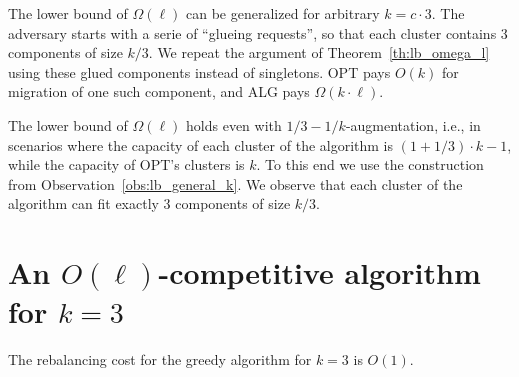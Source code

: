 \begin{observation}
  The lower bound of $\Omega(\ell)$ can be generalized for arbitrary $k = c\cdot 3$.
  The adversary starts with a serie of ``glueing requests'', so that each cluster contains 3 components of size $k/3$.
  We repeat the argument of Theorem~\ref{th:lb_omega_l} using these glued components instead of singletons.
  OPT pays $O(k)$ for migration of one such component, and ALG pays $\Omega(k \cdot \ell)$.
  \label{obs:lb_general_k}
\end{observation}

\begin{observation}
  The lower bound of $\Omega(\ell)$ holds even with $1/3-1/k$-augmentation, i.e., in scenarios where the capacity of each cluster of the algorithm is $(1+1/3)\cdot k - 1$, while the capacity of OPT's clusters is $k$.
  To this end we use the construction from Observation~\ref{obs:lb_general_k}.
  We observe that each cluster of the algorithm can fit exactly $3$ components of size $k/3$.
\end{observation}

\section{An $O(\ell)$-competitive algorithm for $k=3$}

\begin{theorem}
  The rebalancing cost for the greedy algorithm for $k=3$ is $O(1)$.
  \label{rebalancing-cost}
\end{theorem}

